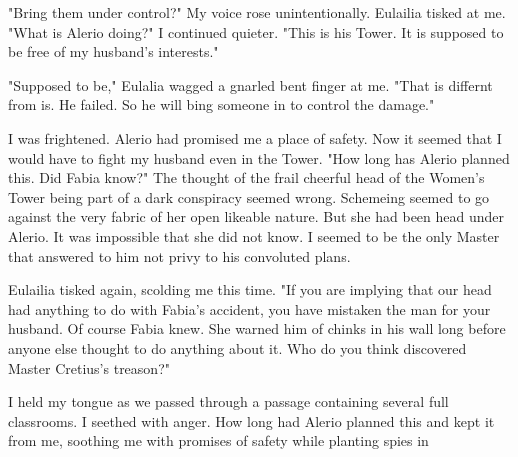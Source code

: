 \documentclass{article}
\begin{document}
"Bring them under control?" My voice rose unintentionally. Eulailia tisked at me. "What is Alerio doing?" I continued quieter. "This is his Tower. It is supposed to be free of my husband's interests."

"Supposed to be," Eulalia wagged a gnarled bent finger at me. "That is differnt from is. He failed. So he will bing someone in to control the damage."

I was frightened. Alerio had promised me a place of safety. Now it seemed that I would have to fight my husband even in the Tower. "How long has Alerio planned this. Did Fabia know?" The thought of the frail cheerful head of the Women's Tower being part of a dark conspiracy seemed wrong. Schemeing seemed to go against the very fabric of her open likeable nature. But she had been head under Alerio. It was impossible that she did not know. I seemed to be the only Master that answered to him not privy to his convoluted plans.

Eulailia tisked again, scolding me this time. "If you are implying that our head had anything to do with Fabia's accident, you have mistaken the man for your husband. Of course Fabia knew. She warned him of chinks in his wall long before anyone else thought to do anything about it. Who do you think discovered Master Cretius's treason?"

I held my tongue as we passed through a passage containing several full classrooms. I seethed with anger. How long had Alerio planned this and kept it from me, soothing me with promises of safety while planting spies in 
\end{document}
